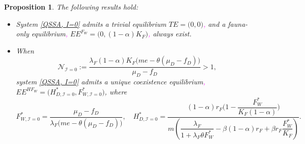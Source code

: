 \documentclass{article}
\newcommand{\lfw}{\lambda_{F}}
\newcommand{\lfw}{\lambda_{F}}
\newcommand{\cI}{\mathcal{I}}
\newcommand{\YD}[1]{\textcolor{magenta}{#1}}
\newtheorem{prop}{Proposition}
\begin{document}
\begin{prop}
\label{theoremEquilibre, I=0}
The following results hold:
\begin{itemize}
\item System \eqref{QSSA, I=0} admits a trivial equilibrium $TE = \Big(0,0\Big)$\YD{,} and a fauna-only equilibrium\YD{,} $EE^{F_W}=\Big(0, (1-\alpha)K_F \Big)$\YD{,} always exist.

\item When
$$
\mathcal{N}_{\cI = 0} := \dfrac{\lfw (1-\alpha)K_F\big(me - \theta (\mu_D - f_D) \big)}{\mu_D - f_D} >1,
$$ 
system \eqref{QSSA, I=0} admits a unique coexistence equilibrium\YD{,} $EE^{HF_W} = \Big(H^*_{D, \cI = 0}, F^*_{W, \cI = 0}\Big)$, where 
$$
F^*_{W, \cI = 0} = \dfrac{\mu_D - f_D}{\lfw \big(me - \theta (\mu_D - f_D) \big)  },
\quad 
H^*_{D, \cI = 0} = \dfrac{(1-\alpha)r_F\Big(1 - \dfrac{F^*_{W}}{K_F(1-\alpha)} \Big)}{m\left(\dfrac{\lfw}{1 + \lfw \theta F_W^*} - \beta (1-\alpha) r_F + \beta r_F  \dfrac{F^*_{W}}{K_F}\right)}
.$$
\end{itemize}
\end{prop}
\end{document}
